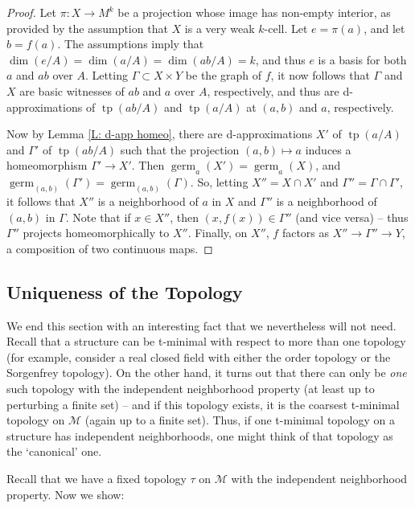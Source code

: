 \documentclass{amsart}
\theoremstyle{definition}
\newcommand{\tp}{\operatorname{tp}}
\begin{document}
    \begin{proof}
        Let $\pi:X\rightarrow M^k$ be a projection whose image has non-empty interior, as provided by the assumption that $X$ is a very weak $k$-cell. Let $e=\pi(a)$, and let $b=f(a)$. The assumptions imply that $\dim(e/A)=\dim(a/A)=\dim(ab/A)=k$, and thus $e$ is a basis for both $a$ and $ab$ over $A$. Letting $\Gamma\subset X\times Y$ be the graph of $f$, it now follows that $\Gamma$ and $X$ are basic witnesses of $ab$ and $a$ over $A$, respectively, and thus are d-approximations of $\tp(ab/A)$ and $\tp(a/A)$ at $(a,b)$ and $a$, respectively.
        
        Now by Lemma \ref{L: d-app homeo}, there are d-approximations $X'$ of $\tp(a/A)$ and $\Gamma'$ of $\tp(ab/A)$ such that the projection $(a,b)\mapsto a$ induces a homeomorphism $\Gamma'\rightarrow X'$. Then $\operatorname{germ}_a(X')=\operatorname{germ}_a(X)$, and $\operatorname{germ}_{(a,b)}(\Gamma')=\operatorname{germ}_{(a,b)}(\Gamma)$. So, letting $X''=X\cap X'$ and $\Gamma''=\Gamma\cap\Gamma'$, it follows that $X''$ is a neighborhood of $a$ in $X$ and $\Gamma''$ is a neighborhood of $(a,b)$ in $\Gamma$. Note that if $x\in X''$, then $(x,f(x))\in\Gamma''$ (and vice versa) -- thus $\Gamma''$ projects homeomorphically to $X''$. Finally, on $X''$, $f$ factors as $X''\rightarrow \Gamma''\rightarrow Y$, a composition of two continuous maps. 
    \end{proof}

        \subsection{Uniqueness of the Topology}

    We end this section with an interesting fact that we nevertheless will not need. Recall that a structure can be t-minimal with respect to more than one topology (for example, consider a real closed field with either the order topology or the Sorgenfrey topology). On the other hand, it turns out that there can only be \textit{one} such topology with the independent neighborhood property (at least up to perturbing a finite set) -- and if this topology exists, it is the coarsest t-minimal topology on $\mathcal M$ (again up to a finite set). Thus, if one t-minimal topology on a structure has independent neighborhoods, one might think of that topology as the `canonical' one.

    Recall that we have a fixed topology $\tau$ on $\mathcal M$ with the independent neighborhood property. Now we show:
\end{document}
